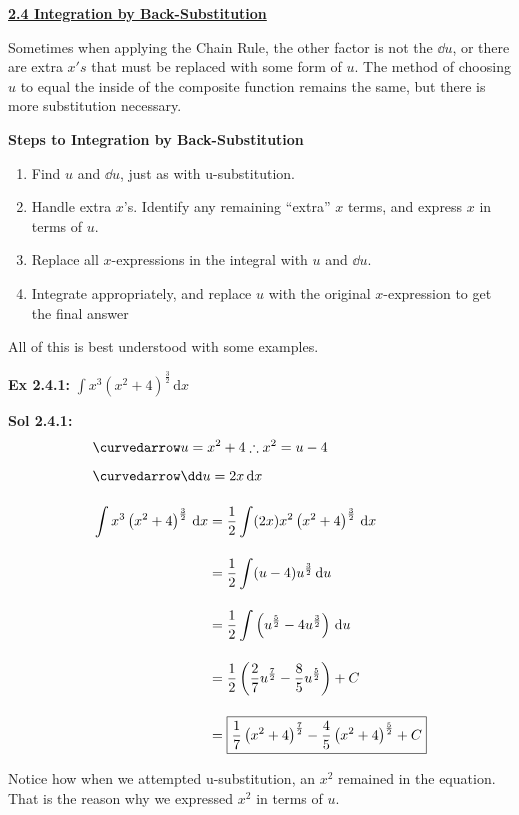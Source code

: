 \textbf{\underline{\large{2.4 Integration by Back-Substitution}}} \par

Sometimes when applying the Chain Rule, the other factor is not the $\dd u$, or there are extra $x's$ that must be replaced with some form of $u$. The method of choosing $u$ to equal the inside of the composite function remains the same, but there is more substitution necessary. \par

\textbf{Steps to Integration by Back-Substitution} \par

\begin{enumerate}
    \item Find $u$ and $\dd u$, just as with u-substitution.
    \item Handle extra $x$'s. Identify any remaining ``extra'' $x$ terms, and express $x$ in terms of $u$.
    \item Replace all $x$-expressions in the integral with $u$ and $\dd u$.
    \item Integrate appropriately, and replace $u$ with the original $x$-expression to get the final answer
\end{enumerate} \vspace{11pt}

All of this is best understood with some examples.

\begin{tcolorbox}[example]
    \textbf{Ex 2.4.1: } $\int x^3\left(x^2 + 4\right)^{\frac{3}{2}} \,\mathrm{d}x$
\end{tcolorbox}
\begin{tcolorbox}[solution]
    \textbf{Sol 2.4.1: } \begin{align*}
        & \curvedarrow u = x^2 + 4 \therefore x^2 = u - 4 \\[5.5pt]
        & \curvedarrow \dd u = 2x \,\mathrm{d}x \\[11pt]
        & \int x^3\left(x^2 + 4\right)^{\frac{3}{2}} \,\mathrm{d}x \begin{aligned}[t]
            & = \dfrac{1}{2} \int (2x)x^2\left(x^2 + 4\right)^{\frac{3}{2}} \,\mathrm{d}x \\[11pt]
            & = \dfrac{1}{2} \int (u - 4)u^{\frac{3}{2}} \,\mathrm{d}u \\[11pt]
            & = \dfrac{1}{2} \int \left(u^{\frac{5}{2}} - 4u^{\frac{3}{2}}\right) \,\mathrm{d}u \\[11pt]
            & = \dfrac{1}{2} \left(\dfrac{2}{7}u^{\frac{7}{2}} - \dfrac{8}{5}u^{\frac{5}{2}}\right) + C \\[11pt]
            & = \boxed{\dfrac{1}{7}\left(x^2 + 4\right)^{\frac{7}{2}} - \dfrac{4}{5}\left(x^2 + 4\right)^{\frac{5}{2}} + C}
        \end{aligned}
    \end{align*}

    Notice how when we attempted u-substitution, an $x^2$ remained in the equation. That is the reason why we expressed $x^2$ in terms of $u$.
\end{tcolorbox} \vspace{11pt}

